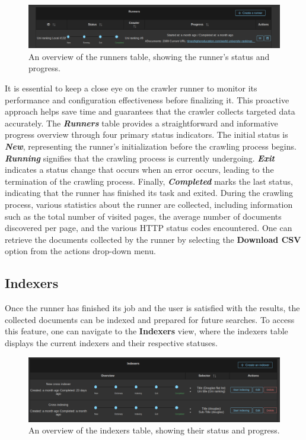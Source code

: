 \begin{figure}[ht]	
     \centering
     \includegraphics[width=13cm]{figures/demo-8.png}
     \caption{An overview of the runners table, showing the runner's status and progress.}
     \label{fig:runners-overview}
\end{figure}


It is essential to keep a close eye on the crawler runner to monitor its performance and configuration effectiveness before finalizing it. This proactive approach helps save time and guarantees that the crawler collects targeted data accurately. The \textit{\textbf{Runners}} table provides a straightforward and informative progress overview through four primary status indicators. The initial status is \textit{\textbf{New}}, representing the runner's initialization before the crawling process begins. \textit{\textbf{Running}} signifies that the crawling process is currently undergoing. \textit{\textbf{Exit}} indicates a status change that occurs when an error occurs, leading to the termination of the crawling process. Finally, \textit{\textbf{Completed}} marks the last status, indicating that the runner has finished its task and exited. During the crawling process, various statistics about the runner are collected, including information such as the total number of visited pages, the average number of documents discovered per page, and the various HTTP status codes encountered. One can retrieve the documents collected by the runner by selecting the \textbf{Download CSV} option from the actions drop-down menu.


\subsection{Indexers}
Once the runner has finished its job and the user is satisfied with the results, the collected documents can be indexed and prepared for future searches. To access this feature, one can navigate to the \textbf{Indexers} view, where the indexers table displays the current indexers and their respective statuses.


\begin{figure}[h]	
     \centering
     \includegraphics[width=13cm]{figures/demo-10.png}
     \caption{An overview of the indexers table, showing their status and progress.}
     \label{fig:indexers-overview}
\end{figure}

